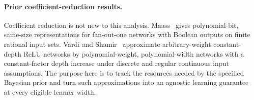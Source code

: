 \documentclass[11pt]{article}
\begin{document}
\paragraph{Prior coefficient-reduction results.}
Coefficient reduction is not new to this analysis. Maass~\cite{maass} gives polynomial-bit, same-size representations for fan-out-one networks with Boolean outputs on finite rational input sets. Vardi and Shamir~\cite{vardi-shamir} approximate arbitrary-weight constant-depth ReLU networks by polynomial-weight, polynomial-width networks with a constant-factor depth increase under discrete and regular continuous input assumptions. The purpose here is to track the resources needed by the specified Bayesian prior and turn such approximations into an agnostic learning guarantee at every eligible learner width.






\appendix

\end{document}
